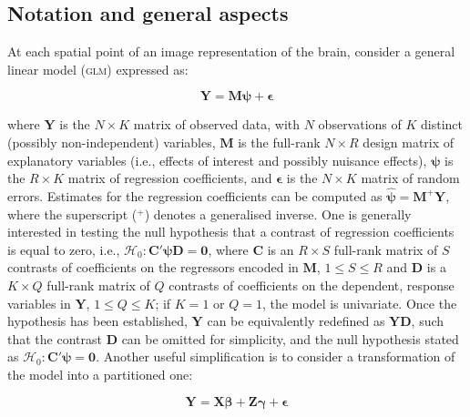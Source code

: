 \subsection{Notation and general aspects}
\label{sec:accel:notation}

At each spatial point of an image representation of the brain, consider a general linear model (\textsc{glm}) \citep{Scheffe1959, Searle1971} expressed as:

\begin{equation}
\mathbf{Y} =  \mathbf{M} \boldsymbol{\psi} + \boldsymbol{\epsilon}
\label{eqn:glmfull}
\end{equation}

\noindent
where $\mathbf{Y}$ is the $N \times K$ matrix of observed data, with $N$ observations of $K$ distinct (possibly non-independent) variables, $\mathbf{M}$ is the full-rank $N \times R$ design matrix of explanatory variables (i.e., effects of interest and possibly nuisance effects), $\boldsymbol{\psi}$ is the $R \times K$ matrix of regression coefficients, and $\boldsymbol{\epsilon}$ is the $N \times K$ matrix of random errors. Estimates for the regression coefficients can be computed as $\boldsymbol{\hat{\psi}} = \mathbf{M}^{+}\mathbf{Y}$, where the superscript ($^{+}$) denotes a generalised inverse. One is generally interested in testing the null hypothesis that a contrast of regression coefficients is equal to zero, i.e., $\mathcal{H}_{0} : \mathbf{C}'\boldsymbol{\psi}\mathbf{D} = \boldsymbol{0}$, where $\mathbf{C}$ is an $R \times S$ full-rank matrix of $S$ contrasts of coefficients on the regressors encoded in $\mathbf{M}$, $1 \leqslant S \leqslant R$ and $\mathbf{D}$ is a $K \times Q$ full-rank matrix of $Q$ contrasts of coefficients on the dependent, response variables in $\mathbf{Y}$, $1 \leqslant Q \leqslant K$; if $K=1$ or $Q=1$, the model is univariate. Once the hypothesis has been established, $\mathbf{Y}$ can be equivalently redefined as $\mathbf{Y}\mathbf{D}$, such that the contrast $\mathbf{D}$ can be omitted for simplicity, and the null hypothesis stated as $\mathcal{H}_{0} : \mathbf{C}'\boldsymbol{\psi} = \boldsymbol{0}$. Another useful simplification is to consider a transformation of the model into a partitioned one:

\begin{equation}
\mathbf{Y} = \mathbf{X}\boldsymbol{\beta} + \mathbf{Z}\boldsymbol{\gamma} + \boldsymbol{\epsilon}
\label{eqn:glmpart}
\end{equation}

